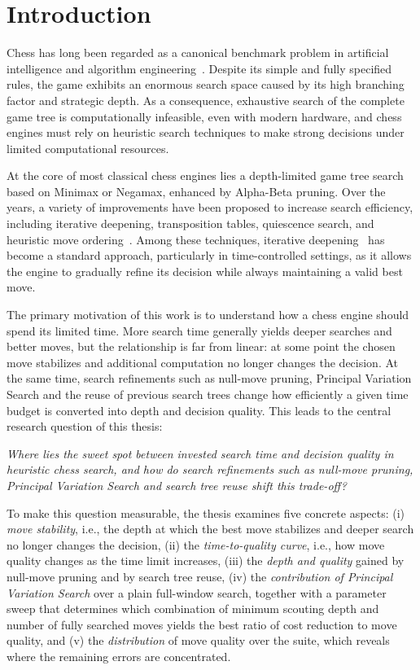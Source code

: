 \section{Introduction}
\label{sec:introduction}

Chess has long been regarded as a canonical benchmark problem in artificial
intelligence and algorithm engineering~\cite{yannakakis2018artificial, knuth1975alphabeta, silver2018alphazero}.
Despite its simple and fully specified
rules, the game exhibits an enormous search space caused by its high branching
factor and strategic depth. As a consequence, exhaustive search of the complete
game tree is computationally infeasible, even with modern hardware, and chess
engines must rely on heuristic search techniques to make strong decisions under
limited computational resources.

At the core of most classical chess engines lies a depth-limited game tree
search based on Minimax or Negamax, enhanced by Alpha-Beta pruning. Over the
years, a variety of improvements have been proposed to increase search
efficiency, including iterative deepening, transposition tables, quiescence
search, and heuristic move ordering~\cite{marsland1986review}. Among these
techniques, iterative deepening~\cite{korf1985iterative} has become a standard
approach, particularly in time-controlled settings, as it allows the engine to
gradually refine its decision while always maintaining a valid best move.

The primary motivation of this work is to understand how a chess engine should
spend its limited time. More search time generally yields deeper searches and
better moves, but the relationship is far from linear: at some point the chosen
move stabilizes and additional computation no longer changes the decision. At
the same time, search refinements such as null-move pruning, Principal Variation
Search and the reuse of previous search trees change how efficiently a given time
budget is converted into depth and decision quality. This leads to the central
research question of this thesis:

\emph{Where lies the sweet spot between invested search time and decision
quality in heuristic chess search, and how do search refinements such as
null-move pruning, Principal Variation Search and search tree reuse shift this
trade-off?}

To make this question measurable, the thesis examines five concrete aspects:
(i) \emph{move stability}, i.e., the depth at which the best move stabilizes
and deeper search no longer changes the decision, (ii) the
\emph{time-to-quality curve}, i.e., how move quality changes as the time limit
increases, (iii) the \emph{depth and quality} gained by null-move pruning and by
search tree reuse, (iv) the \emph{contribution of Principal Variation Search} over
a plain full-window search, together with a parameter sweep that determines which
combination of minimum scouting depth and number of fully searched moves yields
the best ratio of cost reduction to move quality, and (v) the \emph{distribution}
of move quality over the suite, which reveals where the remaining errors are
concentrated.

